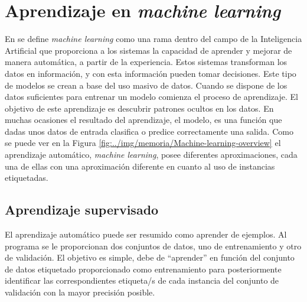 \section{Aprendizaje en \textit{machine learning}}
En \cite{sanchez_2020} se define \textit{machine learning} como una rama dentro del campo de la Inteligencia Artificial que proporciona a los sistemas la capacidad de aprender y mejorar de manera automática, a partir de la experiencia. Estos sistemas transforman los datos en información, y con esta información pueden tomar decisiones. Este tipo de modelos se crean a base del uso masivo de datos. Cuando se dispone de los datos suficientes para entrenar un modelo comienza el proceso de aprendizaje. El objetivo de este aprendizaje es descubrir patrones ocultos en los datos. En muchas ocasiones el resultado del aprendizaje, el modelo, es una función que dadas unos datos de entrada clasifica o predice correctamente una salida. Como se puede ver en la Figura \ref{fig:../img/memoria/Machine-learning-overview} el aprendizaje automático, \textit{machine learning}, posee diferentes aproximaciones, cada una de ellas con una aproximación diferente en cuanto al uso de instancias etiquetadas.



\subsection{Aprendizaje supervisado}\label{subsec:Aprendizaje-Supervisado}
El aprendizaje automático puede ser resumido como aprender de ejemplos. Al programa se le proporcionan dos conjuntos de datos, uno de entrenamiento y otro de validación.\cite{learned2014introduction} El objetivo es simple, debe de ``aprender'' en función del conjunto de datos etiquetado proporcionado como entrenamiento para posteriormente identificar las correspondientes etiqueta/s de cada instancia del conjunto de validación con la mayor precisión posible. 

